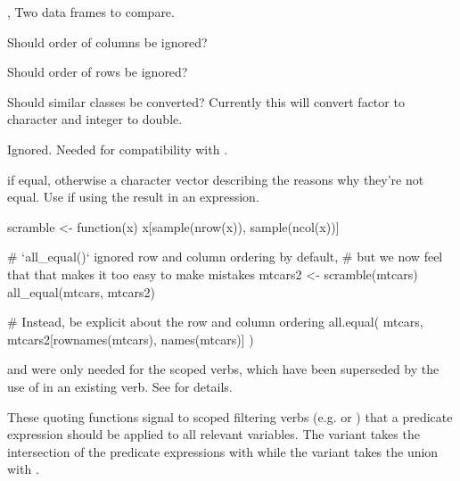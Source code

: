\documentclass[a4paper]{book}
\begin{document}
%
\begin{Arguments}
\begin{ldescription}
\item[\code{target}, \code{current}] Two data frames to compare.

\item[\code{ignore\_col\_order}] Should order of columns be ignored?

\item[\code{ignore\_row\_order}] Should order of rows be ignored?

\item[\code{convert}] Should similar classes be converted? Currently this will
convert factor to character and integer to double.

\item[\code{...}] Ignored. Needed for compatibility with .
\end{ldescription}
\end{Arguments}
%
\begin{Value}
 if equal, otherwise a character vector describing
the reasons why they're not equal. Use  if using the
result in an  expression.
\end{Value}
%
\begin{Examples}
\begin{ExampleCode}
scramble <- function(x) x[sample(nrow(x)), sample(ncol(x))]

# `all_equal()` ignored row and column ordering by default,
# but we now feel that that makes it too easy to make mistakes
mtcars2 <- scramble(mtcars)
all_equal(mtcars, mtcars2)

# Instead, be explicit about the row and column ordering
all.equal(
  mtcars,
  mtcars2[rownames(mtcars), names(mtcars)]
)
\end{ExampleCode}
\end{Examples}
%
\begin{Description}
\strong{[Superseded]}

 and  were only needed for the scoped verbs, which
have been superseded by the use of  in an existing verb. See
 for details.

These quoting functions signal to scoped filtering verbs
(e.g.  or ) that a predicate expression
should be applied to all relevant variables. The 
variant takes the intersection of the predicate expressions with
\code{\&} while the  variant takes the union with \code{|}.
\end{Description}
\end{document}
